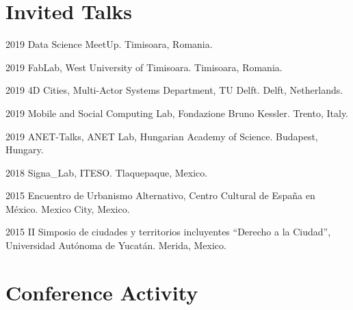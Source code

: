 \documentclass{academiccv}
\begin{document}
\section*{Invited Talks}
\begin{tablist}
	\item[2019] \tab Data Science MeetUp. Timisoara, Romania.
	\item[2019] \tab FabLab, West University of Timisoara. Timisoara, Romania.
	\item[2019] \tab 4D Cities, Multi-Actor Systems Department, TU Delft. Delft, Netherlands.
	\item[2019] \tab Mobile and Social Computing Lab, Fondazione Bruno Kessler. Trento, Italy.
	\item[2019] \tab ANET-Talks, ANET Lab, Hungarian Academy of Science. Budapest, Hungary.
	\item[2018] \tab Signa\_Lab, ITESO. Tlaquepaque, Mexico.
	\item[2015] \tab Encuentro de Urbanismo Alternativo, Centro Cultural de España en México. Mexico City, Mexico.
	\item[2015] \tab II Simposio de ciudades y territorios incluyentes \enquote{Derecho a la Ciudad}, Universidad Autónoma de Yucatán. Merida, Mexico.
\end{tablist}

\section*{Conference Activity}

\end{document}
